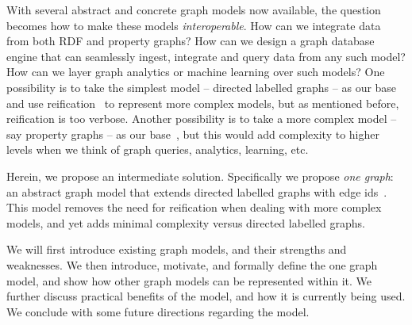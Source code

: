 With several abstract and concrete graph models now available, the question becomes how to make these models \textit{interoperable}. How can we integrate data from both RDF and property graphs? How can we design a graph database engine that can seamlessly ingest, integrate and query data from any such model? How can we layer graph analytics or machine learning over such models? One possibility is to take the simplest model -- directed labelled graphs -- as our base and use reification~\cite{HernandezHK15} to represent more complex models, but as mentioned before, reification is too verbose. Another possibility is to take a more complex model -- say property graphs -- as our base~\cite{Hartig14,AnglesTT20}, but this would add complexity to higher levels when we think of graph queries, analytics, learning, etc.

Herein, we propose an intermediate solution. Specifically we propose \textit{one graph}: an abstract graph model that extends directed labelled graphs with edge ids~\cite{IlievskiGCDYRLL20,LassilaSBBBKKLST,VrgocRAAABHNRR21}. This model removes the need for reification when dealing with more complex models, and yet adds minimal complexity versus directed labelled graphs. 

We will first introduce existing graph models, and their strengths and weaknesses. We then introduce, motivate, and formally define the one graph model, and show how other graph models can be represented within it. We further discuss practical benefits of the model, and how it is currently being used. We conclude with some future directions regarding the model.